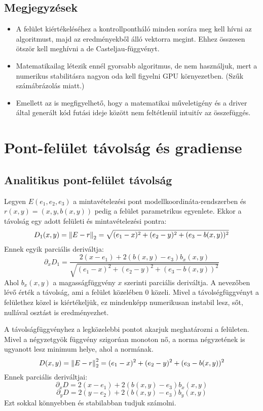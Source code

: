 \subsection{Megjegyzések}
\begin{itemize}
	\item A felület kiértékeléséhez a kontrollpontháló minden sorára meg kell hívni az algoritmust, majd az eredményekből álló vektorra megint. Ehhez összesen ötször kell meghívni a de Casteljau-függvényt.
	\item Matematikailag létezik ennél gyorsabb algoritmus, de nem használjuk, mert a numerikus stabilitásra nagyon oda kell figyelni GPU környezetben. (Szűk számábrázolás miatt.)
	\item Emellett az is megfigyelhető, hogy a matematikai műveletigény és a driver által generált kód futási ideje között nem feltétlenül intuitív az összefüggés.
\end{itemize}


\section{Pont-felület távolság és gradiense}

\subsection{Analitikus pont-felület távolság}
Legyen $E(e_1,e_2,e_3)$ a mintavételezési pont modellkoordináta-rendszerben és $r(x,y) = (x,y,b(x,y))$ pedig a felület parametrikus egyenlete. Ekkor a távolság egy adott felületi és mintavételezési pontra:
$$ D_1(x,y) = \norm{E-r}_2 = \sqrt{(e_1-x)^2 + (e_2-y)^2 + (e_3-b(x,y))^2} $$
Ennek egyik parciális deriváltja: 
$$ \partial_xD_1 = \frac{2(x-e_1) + 2(b(x,y)-e_3)b_x(x,y)}{\sqrt{(e_1-x)^2 + (e_2-y)^2 + (e_3-b(x,y))^2}} $$
Ahol $b_x(x,y)$ a magasságfüggvény $x$ szerinti parciális deriváltja. A nevezőben lévő érték a távolság, ami a felület közelében $0$ közeli. Mivel a távolségfüggvényt a felülethez közel is kiértékeljük, ez mindenképp numerikusan instabil lesz, sőt, nullával osztást is eredményezhet. 

A távolságfüggvényhez a legközelebbi pontot akarjuk meghatározni a felületen. Mivel a négyzetgyök függvény szigorúan monoton nő, a norma négyzetének is ugyanott lesz minimum helye, ahol a normának.
$$ D(x,y) = \norm{E-r}_2^2 = (e_1-x)^2 + (e_2-y)^2 + (e_3-b(x,y))^2 $$
Ennek parciális deriváltjai: 
$$ \partial_xD = 2(x-e_1) + 2(b(x,y)-e_3)b_x(x,y) $$
$$ \partial_yD = 2(y-e_2) + 2(b(x,y)-e_3)b_y(x,y) $$
Ezt sokkal könnyebben és stabilabban tudjuk számolni.

